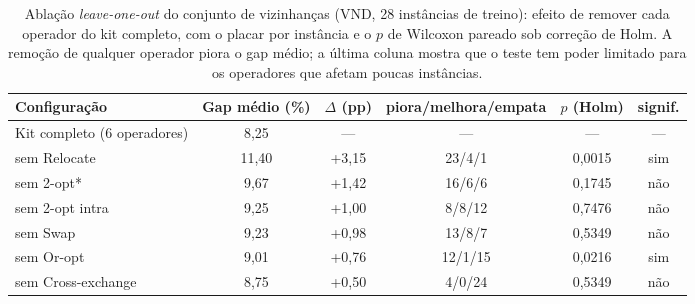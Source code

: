 \begin{table}[H]
\centering
\caption{Ablação \emph{leave-one-out} do conjunto de vizinhanças (VND, 28 instâncias de treino): efeito de remover cada operador do kit completo, com o placar por instância e o $p$ de Wilcoxon pareado sob correção de Holm. A remoção de qualquer operador piora o gap médio; a última coluna mostra que o teste tem poder limitado para os operadores que afetam poucas instâncias.}\label{tab:ablacao}
\small\setlength{\tabcolsep}{4pt}
\begin{tabular}{lccccc}
\toprule
\textbf{Configuração} & \textbf{Gap médio (\%)} & \textbf{$\Delta$ (pp)} & \textbf{piora/melhora/empata} & \textbf{$p$ (Holm)} & \textbf{signif.} \\
\midrule
Kit completo (6 operadores) & 8{,}25 & --- & --- & --- & --- \\
\quad sem Relocate & 11{,}40 & +3{,}15 & 23/4/1 & 0{,}0015 & sim \\
\quad sem 2-opt\hspace{0.5pt}* & 9{,}67 & +1{,}42 & 16/6/6 & 0{,}1745 & não \\
\quad sem 2-opt intra & 9{,}25 & +1{,}00 & 8/8/12 & 0{,}7476 & não \\
\quad sem Swap & 9{,}23 & +0{,}98 & 13/8/7 & 0{,}5349 & não \\
\quad sem Or-opt & 9{,}01 & +0{,}76 & 12/1/15 & 0{,}0216 & sim \\
\quad sem Cross-exchange & 8{,}75 & +0{,}50 & 4/0/24 & 0{,}5349 & não \\
\bottomrule
\end{tabular}
\end{table}
